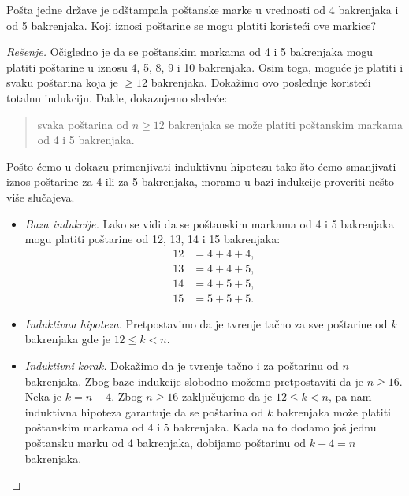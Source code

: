 \begin{EX}
  Po\v sta jedne dr\v zave je od\v stampala po\v stanske marke u vrednosti od 4 bakrenjaka i od 5 bakrenjaka.
  Koji iznosi po\v starine se mogu platiti koriste\'ci ove markice?
\end{EX}
\begin{proof}[Re\v senje]
  O\v cigledno je da se po\v stanskim markama od 4 i 5 bakrenjaka mogu platiti po\v starine u iznosu
  4, 5, 8, 9 i 10 bakrenjaka. Osim toga, mogu\'ce je platiti i svaku po\v starina koja je $\ge 12$ bakrenjaka.
  Doka\v zimo ovo poslednje koriste\'ci totalnu indukciju. Dakle, dokazujemo slede\'ce:
  \begin{quote}
    svaka po\v starina od $n \ge 12$ bakrenjaka se mo\v ze platiti po\v stanskim markama od 4 i 5 bakrenjaka.
  \end{quote}
  Po\v sto \'cemo u dokazu primenjivati induktivnu hipotezu tako \v sto \'cemo smanjivati iznos po\v starine za 4 ili za 5 bakrenjaka,
  moramo u bazi indukcije proveriti ne\v sto vi\v se slu\v cajeva.
  \begin{itemize}
  \item
    \emph{Baza indukcije.} Lako se vidi da se po\v stanskim markama od 4 i 5 bakrenjaka mogu platiti
    po\v starine od 12, 13, 14 i 15 bakrenjaka:
    \begin{align*}
      12 &= 4 + 4 + 4,\\
      13 &= 4 + 4 + 5,\\
      14 &= 4 + 5 + 5,\\
      15 &= 5 + 5 + 5.
    \end{align*}
  
  \item
    \emph{Induktivna hipoteza.} Pretpostavimo da je tvr\dj enje ta\v cno za sve po\v starine od $k$ bakrenjaka gde je $12 \le k < n$.
  \item
    \emph{Induktivni korak.} Doka\v zimo da je tvr\dj enje ta\v cno i za po\v starinu od $n$ bakrenjaka.
    Zbog baze indukcije slobodno mo\v zemo pretpostaviti da je $n \ge 16$.
    Neka je $k = n - 4$. Zbog $n \ge 16$ zaklju\v cujemo da je $12 \le k < n$,
    pa nam induktivna hipoteza garantuje da se po\v starina od $k$ bakrenjaka mo\v ze
    platiti po\v stanskim markama od 4 i 5 bakrenjaka. Kada na to dodamo jo\v s jednu po\v stansku marku od 4 bakrenjaka, dobijamo
    po\v starinu od $k + 4 = n$ bakrenjaka.\qedhere
  \end{itemize}
\end{proof}


